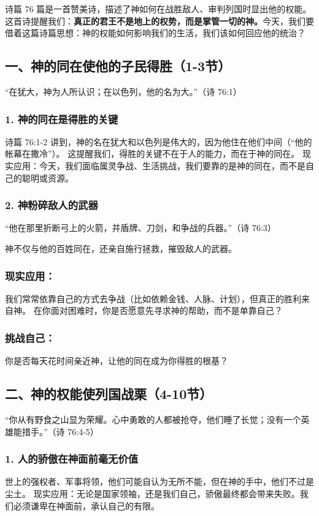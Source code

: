 \documentclass[a4paper, 12pt]{article}
\begin{document}
诗篇 76 篇是一首赞美诗，描述了神如何在战胜敌人、审判列国时显出他的权能。这首诗提醒我们：\textbf{真正的君王不是地上的权势，而是掌管一切的神。}今天，我们要借着这篇诗篇思想：神的权能如何影响我们的生活，我们该如何回应他的统治？

\subsection*{一、神的同在使他的子民得胜（1-3节）}
“在犹大，神为人所认识；在以色列，他的名为大。”（诗 76:1）

\subsubsection*{1. 神的同在是得胜的关键}
诗篇 76:1-2 讲到，神的名在犹大和以色列是伟大的，因为他住在他们中间（“他的帐幕在撒冷”）。
这提醒我们，得胜的关键不在于人的能力，而在于神的同在。
现实应用：今天，我们面临属灵争战、生活挑战，我们要靠的是神的同在，而不是自己的聪明或资源。
\subsubsection*{2. 神粉碎敌人的武器}
“他在那里折断弓上的火箭，并盾牌、刀剑，和争战的兵器。”（诗 76:3）

神不仅与他的百姓同在，还亲自施行拯救，摧毁敌人的武器。
\subsubsection*{现实应用：}
我们常常依靠自己的方式去争战（比如依赖金钱、人脉、计划），但真正的胜利来自神。
在你面对困难时，你是否愿意先寻求神的帮助，而不是单靠自己？
\subsubsection*{挑战自己：}

你是否每天花时间亲近神，让他的同在成为你得胜的根基？
\subsection*{二、神的权能使列国战栗（4-10节）}
“你从有野食之山显为荣耀。心中勇敢的人都被抢夺，他们睡了长觉；没有一个英雄能措手。”（诗 76:4-5）

\subsubsection*{1. 人的骄傲在神面前毫无价值}
世上的强权者、军事将领，他们可能自认为无所不能，但在神的手中，他们不过是尘土。
现实应用：无论是国家领袖，还是我们自己，骄傲最终都会带来失败。我们必须谦卑在神面前，承认自己的有限。
\end{document}
